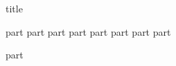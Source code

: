 \documentclass[paper=8.125in:10.250in,pagesize=pdftex,
    headinclude=false,footinclude=false,final,twoside,egregdoesnotlikesansseriftitles]{kaobook}
\begin{document}
{title}
\mainmatter

{part}
{part}
{part}
{part}
{part}
{part}
{part}
{part}


\backmatter
{part}
\end{document}
